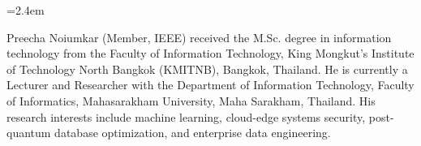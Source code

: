 \documentclass[10pt,journal,compsoc]{IEEEtran}
\begin{document}
{\emergencystretch=2.4em\sloppy


}

\begin{IEEEbiographynophoto}{Preecha Noiumkar}
(Member, IEEE) received the M.Sc. degree in information technology from the Faculty of Information Technology, King Mongkut's Institute of Technology North Bangkok (KMITNB), Bangkok, Thailand. He is currently a Lecturer and Researcher with the Department of Information Technology, Faculty of Informatics, Mahasarakham University, Maha Sarakham, Thailand. His research interests include machine learning, cloud-edge systems security, post-quantum database optimization, and enterprise data engineering.
\end{IEEEbiographynophoto}
\end{document}
